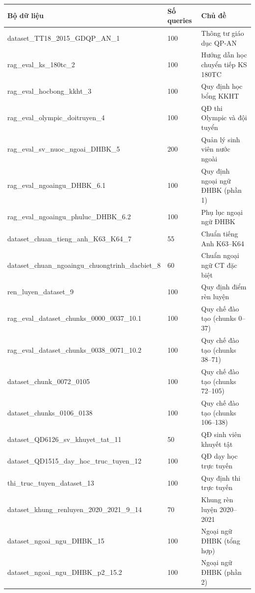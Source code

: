 \documentclass[../DoAn.tex]{subfiles}
\begin{document}
\begin{table}[H]
\centering
\footnotesize
\begin{tabular}{|l|l|p{5.5cm}|}
\hline
\textbf{Bộ dữ liệu} & \textbf{Số queries} & \textbf{Chủ đề} \\
\hline
dataset\_TT18\_2015\_GDQP\_AN\_1 & 100 & Thông tư giáo dục QP-AN \\
\hline
rag\_eval\_ks\_180tc\_2 & 100 & Hướng dẫn học chuyển tiếp KS 180TC \\
\hline
rag\_eval\_hocbong\_kkht\_3 & 100 & Quy định học bổng KKHT \\
\hline
rag\_eval\_olympic\_doitruyen\_4 & 100 & QĐ thi Olympic và đội tuyển \\
\hline
rag\_eval\_sv\_nuoc\_ngoai\_DHBK\_5 & 200 & Quản lý sinh viên nước ngoài \\
\hline
rag\_eval\_ngoaingu\_DHBK\_6.1 & 100 & Quy định ngoại ngữ ĐHBK (phần 1) \\
\hline
rag\_eval\_ngoaingu\_phuluc\_DHBK\_6.2 & 100 & Phụ lục ngoại ngữ ĐHBK \\
\hline
dataset\_chuan\_tieng\_anh\_K63\_K64\_7 & 55 & Chuẩn tiếng Anh K63--K64 \\
\hline
dataset\_chuan\_ngoaingu\_chuongtrinh\_dacbiet\_8 & 60 & Chuẩn ngoại ngữ CT đặc biệt \\
\hline
ren\_luyen\_dataset\_9 & 100 & Quy định điểm rèn luyện \\
\hline
rag\_eval\_dataset\_chunks\_0000\_0037\_10.1 & 100 & Quy chế đào tạo (chunks 0--37) \\
\hline
rag\_eval\_dataset\_chunks\_0038\_0071\_10.2 & 100 & Quy chế đào tạo (chunks 38--71) \\
\hline
dataset\_chunk\_0072\_0105 & 100 & Quy chế đào tạo (chunks 72--105) \\
\hline
dataset\_chunks\_0106\_0138 & 100 & Quy chế đào tạo (chunks 106--138) \\
\hline
dataset\_QD6126\_sv\_khuyet\_tat\_11 & 50 & QĐ sinh viên khuyết tật \\
\hline
dataset\_QD1515\_day\_hoc\_truc\_tuyen\_12 & 100 & QĐ dạy học trực tuyến \\
\hline
thi\_truc\_tuyen\_dataset\_13 & 100 & Quy định thi trực tuyến \\
\hline
dataset\_khung\_renluyen\_2020\_2021\_9\_14 & 70 & Khung rèn luyện 2020--2021 \\
\hline
dataset\_ngoai\_ngu\_DHBK\_15 & 100 & Ngoại ngữ ĐHBK (tổng hợp) \\
\hline
dataset\_ngoai\_ngu\_DHBK\_p2\_15.2 & 100 & Ngoại ngữ ĐHBK (phần 2) \\

\end{tabular}
\end{table}
\end{document}
